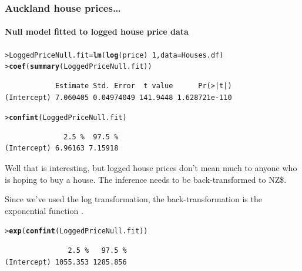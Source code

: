 \documentclass{beamer}\usepackage[]{graphicx}\usepackage[]{xcolor}
\makeatletter
\newcommand{\hlnum}[1]{\textcolor[rgb]{0.686,0.059,0.569}{#1}}%
\newcommand{\hlopt}[1]{\textcolor[rgb]{0,0,0}{#1}}%
\newcommand{\hlstd}[1]{\textcolor[rgb]{0.345,0.345,0.345}{#1}}%
\newcommand{\hlkwb}[1]{\textcolor[rgb]{0.69,0.353,0.396}{#1}}%
\newcommand{\hlkwc}[1]{\textcolor[rgb]{0.333,0.667,0.333}{#1}}%
\newcommand{\hlkwd}[1]{\textcolor[rgb]{0.737,0.353,0.396}{\textbf{#1}}}%
\newenvironment{kframe}{%
 \def\at@end@of@kframe{}%
 \ifinner\ifhmode%
  \def\at@end@of@kframe{\end{minipage}}%
  \begin{minipage}{\columnwidth}%
 \fi\fi%
 \def\FrameCommand##1{\hskip\@totalleftmargin \hskip-\fboxsep
 \colorbox{shadecolor}{##1}\hskip-\fboxsep
     \hskip-\linewidth \hskip-\@totalleftmargin \hskip\columnwidth}%
 \MakeFramed {\advance\hsize-\width
   \@totalleftmargin\z@ \linewidth\hsize
   \@setminipage}}%
 {\par\unskip\endMakeFramed%
 \at@end@of@kframe}
\newenvironment{knitrout}{}{} %
\makeatother
\begin{document}
\begin{frame}[fragile]
\frametitle{Auckland house prices\ldots}
\framesubtitle{Null model fitted to logged house price data}
\begin{knitrout}\scriptsize
{}\color{fgcolor}\begin{kframe}
\begin{alltt}
\hlstd{> }\hlstd{LoggedPriceNull.fit}\hlkwb{=}\hlkwd{lm}\hlstd{(}\hlkwd{log}\hlstd{(price)}\hlopt{~}\hlnum{1}\hlstd{,} \hlkwc{data}\hlstd{=Houses.df)}
\hlstd{> }\hlkwd{coef}\hlstd{(}\hlkwd{summary}\hlstd{(LoggedPriceNull.fit))}
\end{alltt}
\begin{verbatim}
            Estimate Std. Error  t value      Pr(>|t|)
(Intercept) 7.060405 0.04974049 141.9448 1.628721e-110
\end{verbatim}
\end{kframe}
\end{knitrout}

\begin{knitrout}\scriptsize
{}\color{fgcolor}\begin{kframe}
\begin{alltt}
\hlstd{> }\hlkwd{confint}\hlstd{(LoggedPriceNull.fit)}
\end{alltt}
\begin{verbatim}
              2.5 %  97.5 %
(Intercept) 6.96163 7.15918
\end{verbatim}
\end{kframe}
\end{knitrout}

Well that is interesting, but logged house prices don't mean much to anyone who is hoping to buy a house. The inference needs to be back-transformed to NZ\$. 

Since we've used the log transformation, the back-transformation is the exponential function .

\begin{knitrout}\scriptsize
{}\color{fgcolor}\begin{kframe}
\begin{alltt}
\hlstd{> }\hlkwd{exp}\hlstd{(}\hlkwd{confint}\hlstd{(LoggedPriceNull.fit))}
\end{alltt}
\begin{verbatim}
               2.5 %   97.5 %
(Intercept) 1055.353 1285.856
\end{verbatim}
\end{kframe}
\end{knitrout}

\end{frame}
\end{document}
